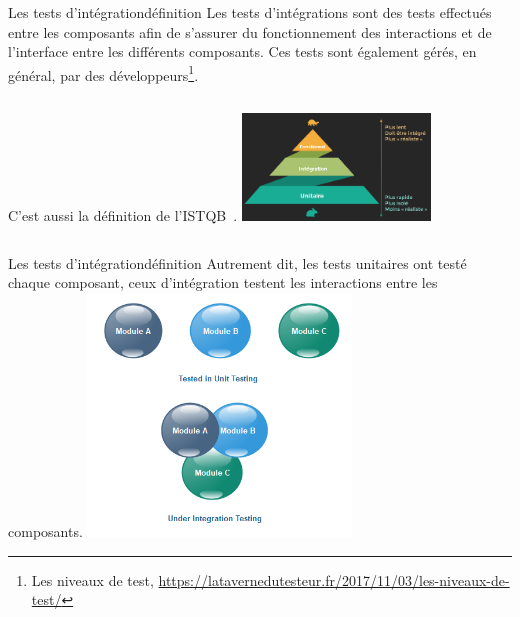 \documentclass{beamer}
\begin{document}
    \begin{frame}{Les tests d'intégration}{définition}
        Les tests d’intégrations sont des tests effectués entre les composants afin de s’assurer du fonctionnement des interactions et de l’interface entre les différents composants.
        Ces tests sont également gérés, en général, par des développeurs\footnote{Les niveaux de test, \url{https://latavernedutesteur.fr/2017/11/03/les-niveaux-de-test/}}.
        \begin{columns}
            C'est aussi la définition de l'ISTQB\footnotemark~.
            \centering
            \includegraphics[width=5cm]{image/classic-test-pyramid}
        \end{columns}
    \end{frame}

    \begin{frame}{Les tests d'intégration}{définition}
        Autrement dit, les tests unitaires ont testé chaque composant, ceux d'intégration testent les interactions entre les composants.
        \bigbreak
        \centering
        \includegraphics[width=7cm]{image/integration-testing-vs-unit-testing}
    \end{frame}
\end{document}
